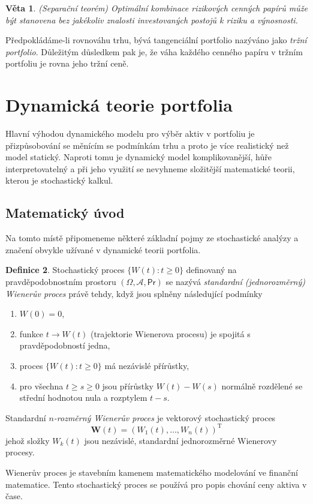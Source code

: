 \documentclass[a4paper,12pt]{report}
\newtheorem{veta}{Věta}
\theoremstyle{definition} \newtheorem{definice}[veta]{Definice}
\theoremstyle{remark}
\begin{document}
\begin{veta}(Separační teorém)
Optimální kombinace rizikových cenných papírů může být stanovena bez jakékoliv znalosti investovaných postojů k riziku a výnosnosti.
\end{veta}

Předpokládáme-li rovnováhu trhu, bývá tangenciální portfolio nazýváno jako \textit{tržní portfolio}.
Důležitým důsledkem pak je, že váha každého cenného papíru v tržním portfoliu je rovna jeho tržní ceně. \label{vahy_trznihodnota}



\section{Dynamická teorie portfolia}
Hlavní výhodou dynamického modelu pro výběr aktiv v portfoliu je při\-způsobování se měnícím se podmínkám trhu a proto je více realistický než model statický.
Naproti tomu je dynamický model komplikovanější, hůře interpretovatelný a při jeho využití se nevyhneme složitější matematické teorii, kterou je stochastický kalkul.

\subsection{Matematický úvod}
Na tomto místě připomeneme některé základní pojmy ze stochastické analýzy a značení obvykle užívané v dynamické teorii portfolia. 

\begin{definice}
Stochastický proces $\{W(t):t\ge0\}$ definovaný na pravdě\-podob\-nostním prostoru $(\Omega,\mathcal{A},\mathsf{Pr})$ se nazývá \textit{standardní (jednorozměrný) Wienerův proces} právě tehdy, když jsou splněny následující podmínky
\begin{enumerate}
\item[1.]$W(0)=0$, 
\item[2.]funkce $t\to W(t)$ (trajektorie Wienerova procesu) je spojitá s pravdě\-podob\-ností jedna,
\item[3.]proces $\{W(t):t\ge0\}$ má nezávislé přírůstky, 
\item[4.]pro všechna $t\ge s\ge0$ jsou přírůstky $W(t)-W(s)$ normálně rozdělené se střední hodnotou nula a rozptylem $t-s$.
\end{enumerate}
Standardní \textit{$n$-rozměrný Wienerův proces} je vektorový stochastický proces
$$\boldsymbol{W}(t) = (W_1(t), \dots, W_n(t))^\mathrm{T}$$
jehož složky $W_k(t)$ jsou nezávislé, standardní jednorozměrné Wienerovy procesy.
\end{definice}
Wienerův proces je stavebním kamenem matematického modelování ve finanční matematice. 
Tento stochastický proces se používá pro popis chování ceny aktiva v čase. 
\end{document}

